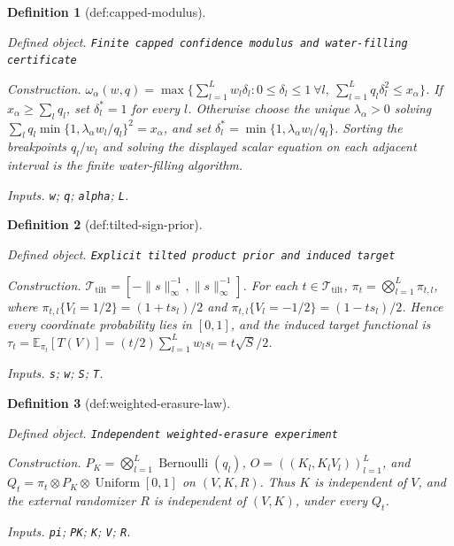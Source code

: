 \documentclass{article}
\newtheorem{definition}{Definition}
\begin{document}
\begin{definition}[def:capped-modulus]\label{def:capped-modulus}
\par\smallskip\noindent\emph{Defined object.} \texttt{Finite capped confidence modulus and water-\allowbreak{}filling certificate}
\par\smallskip\noindent\emph{Construction.} \(\omega_\alpha(w,q)=\max\{\sum_{l=1}^Lw_l\delta_l:0\le\delta_l\le1\ \forall l,\ \sum_{l=1}^Lq_l\delta_l^2\le x_\alpha\}\). If \(x_\alpha\ge\sum_lq_l\), set \(\delta_l^*=1\) for every \(l\). Otherwise choose the unique \(\lambda_\alpha>0\) solving \(\sum_lq_l\min\{1,\lambda_\alpha w_l/q_l\}^2=x_\alpha\), and set \(\delta_l^*=\min\{1,\lambda_\alpha w_l/q_l\}\). Sorting the breakpoints \(q_l/w_l\) and solving the displayed scalar equation on each adjacent interval is the finite water-filling algorithm.
\par\smallskip\noindent\emph{Inputs.} \texttt{w}; \texttt{q}; \texttt{alpha}; \texttt{L}.
\end{definition}

\begin{definition}[def:tilted-sign-prior]\label{def:tilted-sign-prior}
\par\smallskip\noindent\emph{Defined object.} \texttt{Explicit tilted product prior and induced target}
\par\smallskip\noindent\emph{Construction.} \(\mathcal T_{\mathrm{tilt}}=[-\|s\|_\infty^{-1},\|s\|_\infty^{-1}]\). For each \(t\in\mathcal T_{\mathrm{tilt}}\), \(\pi_t=\bigotimes_{l=1}^L\pi_{t,l}\), where \(\pi_{t,l}\{V_l=1/2\}=(1+ts_l)/2\) and \(\pi_{t,l}\{V_l=-1/2\}=(1-ts_l)/2\). Hence every coordinate probability lies in \([0,1]\), and the induced target functional is \(\tau_t=\mathbb E_{\pi_t}[T(V)]=(t/2)\sum_{l=1}^Lw_ls_l=t\sqrt S/2\).
\par\smallskip\noindent\emph{Inputs.} \texttt{s}; \texttt{w}; \texttt{S}; \texttt{T}.
\end{definition}

\begin{definition}[def:weighted-erasure-law]\label{def:weighted-erasure-law}
\par\smallskip\noindent\emph{Defined object.} \texttt{Independent weighted-\allowbreak{}erasure experiment}
\par\smallskip\noindent\emph{Construction.} \(P_K=\bigotimes_{l=1}^L\operatorname{Bernoulli}(q_l)\), \(O=((K_l,K_lV_l))_{l=1}^L\), and \(Q_t=\pi_t\otimes P_K\otimes\operatorname{Uniform}[0,1]\) on \((V,K,R)\). Thus \(K\) is independent of \(V\), and the external randomizer \(R\) is independent of \((V,K)\), under every \(Q_t\).
\par\smallskip\noindent\emph{Inputs.} \texttt{pi}; \texttt{PK}; \texttt{K}; \texttt{V}; \texttt{R}.
\end{definition}
\end{document}
